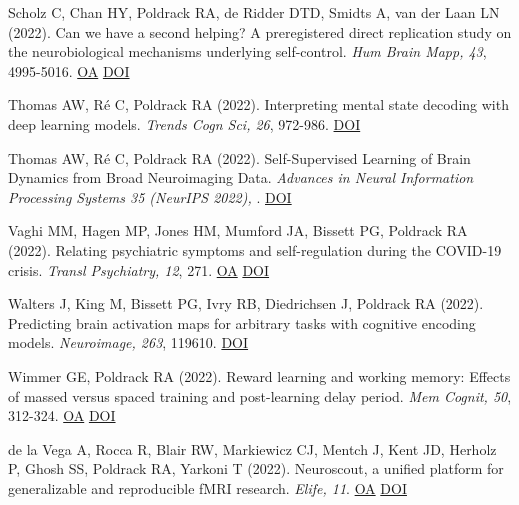 \documentclass[10pt, letterpaper]{article}
\begin{document}
Scholz C, Chan HY, Poldrack RA, de Ridder DTD, Smidts A, van der Laan LN (2022). Can we have a second helping? A preregistered direct replication study on the neurobiological mechanisms underlying self-control. \textit{Hum Brain Mapp, 43}, 4995-5016. \href{https://www.ncbi.nlm.nih.gov/pmc/articles/PMC9582371}{OA} \href{http://dx.doi.org/10.1002/hbm.26065}{DOI} \vspace{2mm}

Thomas AW, Ré C, Poldrack RA (2022). Interpreting mental state decoding with deep learning models. \textit{Trends Cogn Sci, 26}, 972-986. \href{http://dx.doi.org/10.1016/j.tics.2022.07.003}{DOI} \vspace{2mm}

Thomas AW, Ré C, Poldrack RA (2022). Self-Supervised Learning of Brain Dynamics from Broad Neuroimaging Data. \textit{Advances in Neural Information Processing Systems 35 (NeurIPS 2022), }. \href{http://dx.doi.org/None}{DOI} \vspace{2mm}

Vaghi MM, Hagen MP, Jones HM, Mumford JA, Bissett PG, Poldrack RA (2022). Relating psychiatric symptoms and self-regulation during the COVID-19 crisis. \textit{Transl Psychiatry, 12}, 271. \href{https://www.ncbi.nlm.nih.gov/pmc/articles/PMC9274960}{OA} \href{http://dx.doi.org/10.1038/s41398-022-02030-9}{DOI} \vspace{2mm}

Walters J, King M, Bissett PG, Ivry RB, Diedrichsen J, Poldrack RA (2022). Predicting brain activation maps for arbitrary tasks with cognitive encoding models. \textit{Neuroimage, 263}, 119610. \href{http://dx.doi.org/10.1016/j.neuroimage.2022.119610}{DOI} \vspace{2mm}

Wimmer GE, Poldrack RA (2022). Reward learning and working memory: Effects of massed versus spaced training and post-learning delay period. \textit{Mem Cognit, 50}, 312-324. \href{https://www.ncbi.nlm.nih.gov/pmc/articles/PMC8821056}{OA} \href{http://dx.doi.org/10.3758/s13421-021-01233-7}{DOI} \vspace{2mm}

de la Vega A, Rocca R, Blair RW, Markiewicz CJ, Mentch J, Kent JD, Herholz P, Ghosh SS, Poldrack RA, Yarkoni T (2022). Neuroscout, a unified platform for generalizable and reproducible fMRI research. \textit{Elife, 11}. \href{https://www.ncbi.nlm.nih.gov/pmc/articles/PMC9489206}{OA} \href{http://dx.doi.org/10.7554/elife.79277}{DOI} \vspace{2mm}
\end{document}
